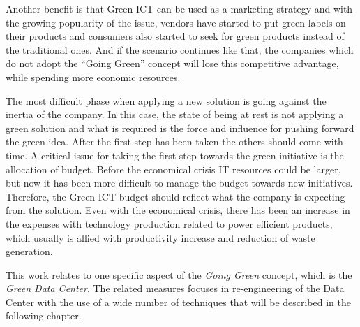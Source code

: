     Another benefit is that Green ICT can be used as a marketing strategy and with the growing popularity of the issue, vendors have started to put green labels on their products and consumers also started to seek for green products instead of the traditional ones. And if the scenario continues like that, the companies which do not adopt the ``Going Green'' concept will lose this competitive advantage, while spending more economic resources.
    
    The most difficult phase when applying a new solution is going against the inertia of the company. In this case, the state of being at rest is not applying a green solution and what is required is the force and influence for pushing forward the green idea. After the first step has been taken the others should come with time. A critical issue for taking the first step towards the green initiative is the allocation of budget. Before the economical crisis IT resources could be larger, but now it has been more difficult to manage the budget towards new initiatives. Therefore, the Green ICT budget should reflect what the company is expecting from the solution. Even with the economical crisis, there has been an increase in the expenses with technology production related to power efficient products, which usually is allied with productivity increase and reduction of waste generation. 
    
        This work relates to one specific aspect of the \emph{Going Green} concept, which is the \emph{Green Data Center}. The related measures focuses in re-engineering of the Data Center with the use of a wide number of techniques that will be described in the following chapter.




